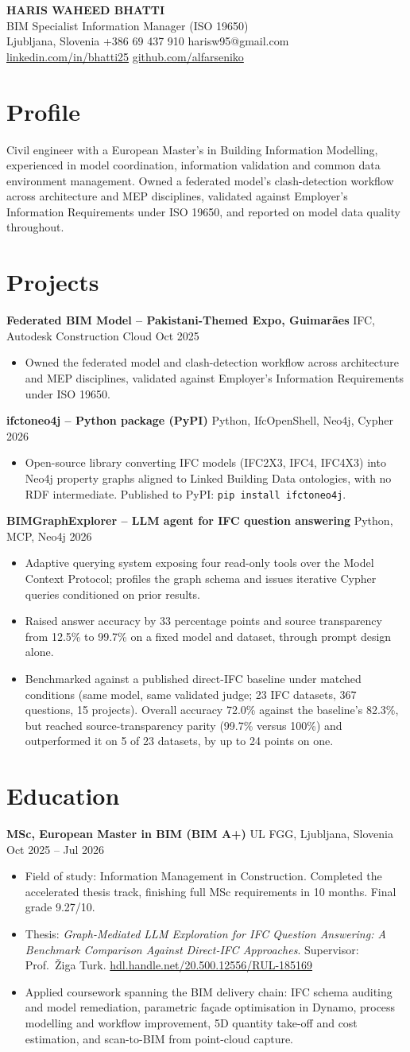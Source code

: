 \documentclass[a4paper,10.5pt]{article}
\newcommand{\datefill}{\dotfill}
\newcommand{\entry}[3]{\vspace{2.5pt}\noindent\textbf{#1} \textbar{} #2 \datefill{} #3\par\vspace{0.5pt}}
\newcommand{\ROLELINE}{BIM Specialist \textbar{} Information Manager (ISO 19650)}
\newcommand{\projIfcToNeo}{%
\entry{ifctoneo4j -- Python package (PyPI)}{Python, IfcOpenShell, Neo4j, Cypher}{2026}
\begin{itemize}
  \item Open-source library converting IFC models (IFC2X3, IFC4, IFC4X3) into Neo4j
        property graphs aligned to Linked Building Data ontologies, with no RDF
        intermediate. Published to PyPI: \texttt{pip install ifctoneo4j}.
\end{itemize}}
\newcommand{\projBIMGraph}{%
\entry{BIMGraphExplorer -- LLM agent for IFC question answering}{Python, MCP, Neo4j}{2026}
\begin{itemize}
  \item Adaptive querying system exposing four read-only tools over the Model
        Context Protocol; profiles the graph schema and issues iterative Cypher
        queries conditioned on prior results.
  \item Raised answer accuracy by 33 percentage points and source transparency from
        12.5\% to 99.7\% on a fixed model and dataset, through prompt design alone.
  \item Benchmarked against a published direct-IFC baseline under matched
        conditions (same model, same validated judge; 23 IFC datasets, 367
        questions, 15 projects). Overall accuracy 72.0\% against the baseline's
        82.3\%, but reached source-transparency parity (99.7\% versus 100\%) and
        outperformed it on 5 of 23 datasets, by up to 24 points on one.
\end{itemize}}
\newcommand{\projGuimaraes}{%
\entry{Federated BIM Model -- Pakistani-Themed Expo, Guimar\~aes}{IFC, Autodesk Construction Cloud}{Oct 2025}
\begin{itemize}
  \item Owned the federated model and clash-detection workflow across architecture
        and MEP disciplines, validated against Employer's Information Requirements
        under ISO 19650.
\end{itemize}}
\begin{document}
\begin{center}
  {\LARGE\bfseries HARIS WAHEED BHATTI}\\[2pt]
  {\large \ROLELINE}\\[3pt]
  Ljubljana, Slovenia \textbar{} +386 69 437 910 \textbar{} harisw95@gmail.com\\
  \href{https://linkedin.com/in/bhatti25}{linkedin.com/in/bhatti25} \textbar{}
  \href{https://github.com/alfarseniko}{github.com/alfarseniko}
\end{center}
\vspace{-4pt}

\section{Profile}

\noindent Civil engineer with a European Master's in Building Information Modelling,
experienced in model coordination, information validation and common data
environment management. Owned a federated model's clash-detection workflow across
architecture and MEP disciplines, validated against Employer's Information
Requirements under ISO 19650, and reported on model data quality throughout.

\section{Projects}

 \projGuimaraes \projIfcToNeo \projBIMGraph

\section{Education}
\entry{MSc, European Master in BIM (BIM A+)}{UL FGG, Ljubljana, Slovenia}{Oct 2025 -- Jul 2026}
\begin{itemize}
  \item Field of study: Information Management in Construction. Completed the
        accelerated thesis track, finishing full MSc requirements in 10 months.
        Final grade 9.27/10.
  \item Thesis: \textit{Graph-Mediated LLM Exploration for IFC Question Answering:
        A Benchmark Comparison Against Direct-IFC Approaches}. Supervisor:
        Prof.~\v{Z}iga Turk. \href{http://hdl.handle.net/20.500.12556/RUL-185169}{hdl.handle.net/20.500.12556/RUL-185169}
  \item Applied coursework spanning the BIM delivery chain: IFC schema auditing and model remediation, parametric façade optimisation in Dynamo, process modelling and workflow improvement, 5D quantity take-off and cost estimation, and scan-to-BIM from point-cloud capture.
\end{itemize}
\end{document}
